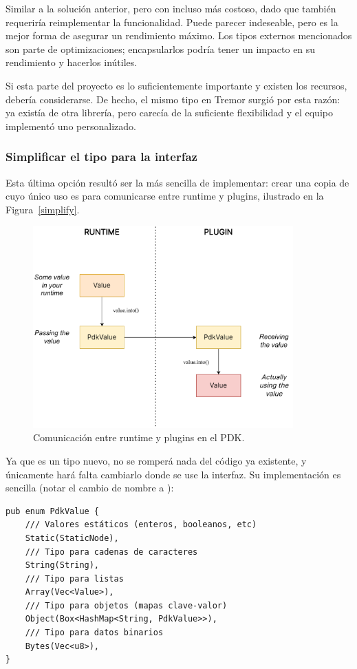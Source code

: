 Similar a la solución anterior, pero con incluso más costoso, dado que también
requeriría reimplementar la funcionalidad. Puede parecer indeseable, pero es la
mejor forma de asegurar un rendimiento máximo. Los tipos externos mencionados
son parte de optimizaciones; encapsularlos podría tener un impacto en su
rendimiento y hacerlos inútiles.

Si esta parte del proyecto es lo suficientemente importante y existen los
recursos, debería considerarse. De hecho, el mismo tipo  en Tremor
surgió por esta razón: ya existía  de otra librería, pero
carecía de la suficiente flexibilidad y el equipo implementó uno personalizado.

\subsubsection{Simplificar el tipo para la interfaz}

Esta última opción resultó ser la más sencilla de implementar: crear una copia
de  cuyo único uso es para comunicarse entre runtime y plugins,
ilustrado en la Figura~\ref{simplify}.

\begin{figure}
    \centering
    \includegraphics[width=10cm]{./Imagenes/simplify.pdf}
    \caption{Comunicación entre runtime y plugins en el PDK.}%
    \label{fig:simplify}
\end{figure}

Ya que es un tipo nuevo, no se romperá nada del código ya existente, y
únicamente hará falta cambiarlo donde se use la interfaz. Su implementación es
sencilla (notar el cambio de nombre a ):

\begin{verbatim}
pub enum PdkValue {
    /// Valores estáticos (enteros, booleanos, etc)
    Static(StaticNode),
    /// Tipo para cadenas de caracteres
    String(String),
    /// Tipo para listas
    Array(Vec<Value>),
    /// Tipo para objetos (mapas clave-valor)
    Object(Box<HashMap<String, PdkValue>>),
    /// Tipo para datos binarios
    Bytes(Vec<u8>),
}
\end{verbatim}

